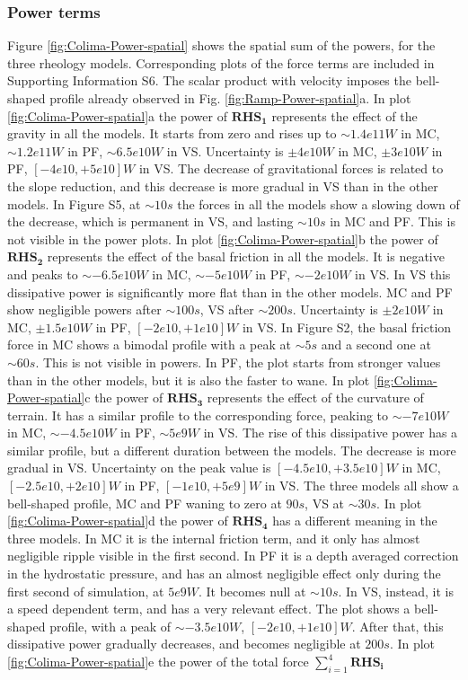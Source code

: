 \documentclass{article}
\begin{document}
\subsubsection{Power terms}
Figure \ref{fig:Colima-Power-spatial} shows the spatial sum of the powers, for the three rheology models. Corresponding plots of the force terms are included in Supporting Information S6. The scalar product with velocity imposes the bell-shaped profile already observed in Fig. \ref{fig:Ramp-Power-spatial}a. In plot \ref{fig:Colima-Power-spatial}a the power of $\boldsymbol{RHS_1}$ represents the effect of the gravity in all the models. It starts from zero and rises up to $\sim 1.4e11 W$ in MC, $\sim 1.2e11 W$ in PF, $\sim 6.5e10 W$ in VS. Uncertainty is $\pm 4e10 W$ in MC, $\pm 3e10 W$ in PF, $[-4e10,+5e10] W$ in VS. The decrease of gravitational forces is related to the slope reduction, and this decrease is more gradual in VS than in the other models. In Figure S5, at $\sim 10 s$ the forces in all the models show a slowing down of the decrease, which is permanent in VS, and lasting $\sim 10 s$ in MC and PF. This is not visible in the power plots. In plot \ref{fig:Colima-Power-spatial}b the power of  $\boldsymbol{RHS_2}$ represents the effect of the basal friction in all the models. It is negative and peaks to $\sim -6.5e10 W$ in MC, $\sim -5e10 W$ in PF, $\sim -2e10 W$ in VS. In VS this dissipative power is significantly more flat than in the other models. MC and PF show negligible powers after $\sim 100 s$, VS after $\sim 200 s$. Uncertainty is $\pm 2e10 W$ in MC, $\pm 1.5e10 W$ in PF, $[-2e10,+1e10] W$ in VS. In Figure S2, the basal friction force in MC shows a bimodal profile with a peak at $\sim 5 s$ and a second one at $\sim 60 s$. This is not visible in powers. In PF, the plot starts from stronger values than in the other models, but it is also the faster to wane. In plot \ref{fig:Colima-Power-spatial}c the power of $\boldsymbol{RHS_3}$ represents the effect of the curvature of terrain. It has a similar profile to the corresponding force, peaking to $\sim -7e10 W$ in MC, $\sim -4.5e10 W$ in PF, $\sim 5e9 W$ in VS. The rise of this dissipative power has a similar profile, but a different duration between the models. The decrease is more gradual in VS. Uncertainty on the peak value is $[-4.5e10,+3.5e10] W$ in MC, $[-2.5e10,+2e10] W$ in PF, $[-1e10,+5e9] W$ in VS. The three models all show a bell-shaped profile, MC and PF waning to zero at $90 s$, VS at $\sim 30 s$. In plot \ref{fig:Colima-Power-spatial}d the power of $\boldsymbol{RHS_4}$ has a different meaning in the three models. In MC it is the internal friction term, and it only has almost negligible ripple visible in the first second. In PF it is a depth averaged correction in the hydrostatic pressure, and has an almost negligible effect only during the first second of simulation, at $5e9 W$. It becomes null at $\sim 10 s$. In VS, instead, it is a speed dependent term, and has a very relevant effect. The plot shows a bell-shaped profile, with a peak of $\sim -3.5e10 W$, $[-2e10,+1e10] W$. After that, this dissipative power gradually decreases, and becomes negligible at $200 s$. In plot \ref{fig:Colima-Power-spatial}e the power of the total force $\sum^4_{i=1}\boldsymbol{RHS_i}$ 
\end{document}
